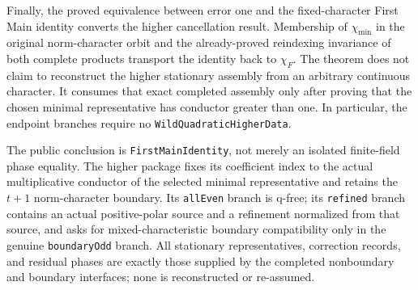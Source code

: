 \begin{theorem}
Finally, the proved equivalence between error one and the fixed-character
First Main identity converts the higher cancellation result.  Membership of
\(\chi_{\min}\) in the original norm-character orbit and the already-proved
reindexing invariance of both complete products transport the identity back
to \(\chi_F\).
\leanok
{}
\FormalizationContract
The theorem does not claim to reconstruct the higher stationary assembly
from an arbitrary continuous character.  It consumes that exact completed
assembly only after proving that the chosen minimal representative has
conductor greater than one.  In particular, the endpoint branches require
no \texttt{WildQuadraticHigherData}.

The public conclusion is \texttt{FirstMainIdentity}, not merely an isolated
finite-field phase equality.  The higher package fixes its coefficient
index to the actual multiplicative conductor of the selected minimal
representative and retains the \(t+1\) norm-character boundary.  Its
\texttt{allEven} branch is q-free; its \texttt{refined} branch contains an
actual positive-polar source and a refinement normalized from that source,
and asks for mixed-characteristic boundary compatibility only in the genuine
\texttt{boundaryOdd} branch.  All stationary representatives, correction
records, and residual phases are exactly those supplied by the completed
nonboundary and boundary interfaces; none is reconstructed or re-assumed.
\end{theorem}
